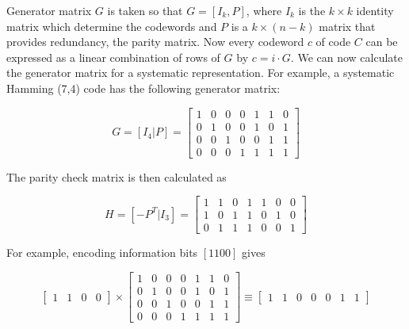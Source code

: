 \documentclass[../main.tex]{subfiles}
\begin{document}
    Generator matrix $G$ is taken so that $G=[I_k,P]$, where $I_k$ is the $k \times k$ identity matrix which determine the codewords and $P$ is a $k \times (n-k)$ matrix that provides redundancy, the parity matrix. Now every codeword $c$ of code $C$ can be expressed as a linear combination of rows of $G$ by $c=i \cdot G$. We can now calculate the generator matrix for a systematic representation. For example, a systematic Hamming (7,4) code has the following generator matrix:

    \begin{equation*}
        G=[I_4|P]=
        \begin{bmatrix}
            1&0&0&0&1&1&0\\
            0&1&0&0&1&0&1\\
            0&0&1&0&0&1&1\\
            0&0&0&1&1&1&1
        \end{bmatrix}
    \end{equation*}

    \noindent
    The parity check matrix is then calculated as

    \begin{equation*}
        H=[-P^T|I_3]=
        \begin{bmatrix}
            1&1&0&1&1&0&0\\
            1&0&1&1&0&1&0\\
            0&1&1&1&0&0&1
        \end{bmatrix}
    \end{equation*}

    \noindent
    For example, encoding information bits $[1 1 0 0]$ gives

    \begin{equation*}
        \begin{bmatrix}
            1&1&0&0
        \end{bmatrix}
        \times
        \begin{bmatrix}
            1&0&0&0&1&1&0\\
            0&1&0&0&1&0&1\\
            0&0&1&0&0&1&1\\
            0&0&0&1&1&1&1
        \end{bmatrix}
        \equiv
        \begin{bmatrix}
            1&1&0&0&0&1&1
        \end{bmatrix}
    \end{equation*}
\end{document}
